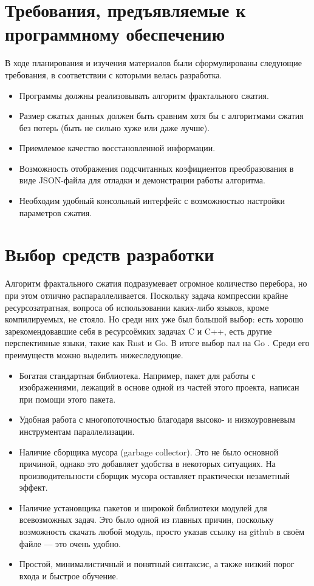 \documentclass[bachelor,paper]{pmk-graduate}
\theoremstyle{definition}
\begin{document}
\section{Требования, предъявляемые к программному обеспечению}

В ходе планирования и изучения материалов были сформулированы следующие требования, в соответствии с которыми велась разработка.
\begin{itemize}
  \item Программы должны реализовывать алгоритм фрактального сжатия.
  \item Размер сжатых данных должен быть сравним хотя бы с алгоритмами сжатия без потерь (быть не сильно хуже или даже лучше).
  \item Приемлемое качество восстановленной информации.
  \item Возможность отображения подсчитанных коэфициентов преобразования в виде JSON-файла для отладки и демонстрации работы алгоритма.
  \item Необходим удобный консольный интерфейс с возможностью настройки параметров сжатия.
\end{itemize}

\section{Выбор средств разработки}
Алгоритм фрактального сжатия подразумевает огромное количество перебора, но при этом отлично распараллеливается. Поскольку задача компрессии крайне ресурсозатратная, вопроса об использовании каких-либо языков, кроме компилируемых, не стояло. Но среди них уже был большой выбор: есть хорошо зарекомендовавшие себя в ресурсоёмких задачах C и C++, есть другие перспективные языки, такие как Rust и Go. В итоге выбор пал на Go \cite{godoc}. Среди его преимуществ можно выделить нижеследующие.
\begin{itemize}
  \item Богатая стандартная библиотека. Например, пакет для работы с изображениями, лежащий в основе одной из частей этого проекта, написан при помощи этого пакета.
  \item Удобная работа с многопоточностью благодаря высоко- и низкоуровневым инструментам параллелизации.
  \item Наличие сборщика мусора (garbage collector). Это не было основной причиной, однако это добавляет удобства в некоторых ситуациях. На производительности сборщик мусора оставляет практически незаметный эффект.
  \item Наличие установщика пакетов и широкой библиотеки модулей для всевозможных задач. Это было одной из главных причин, поскольку возможность скачать любой модуль, просто указав ссылку на github в своём файле --- это очень удобно.
  \item Простой, минималистичный и понятный синтаксис, а также низкий порог входа и быстрое обучение.
\end{itemize}
\end{document}

